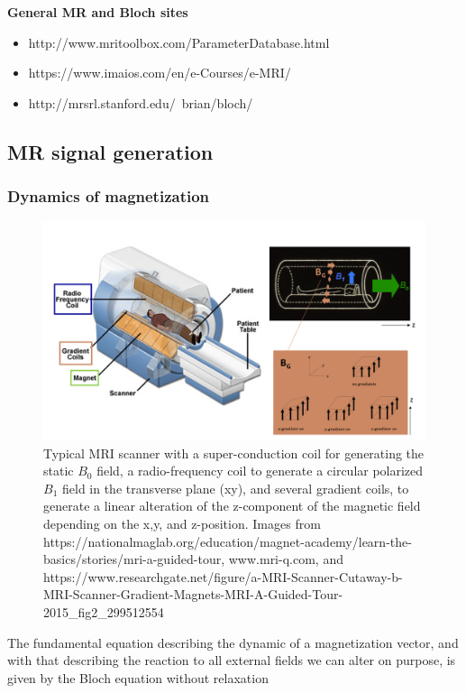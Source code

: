\documentclass[a4paper,12pt]{extarticle}
\begin{document}
\textbf{General MR and Bloch sites}
\begin{itemize}
\item http://www.mritoolbox.com/ParameterDatabase.html
\item https://www.imaios.com/en/e-Courses/e-MRI/
\item http://mrsrl.stanford.edu/~brian/bloch/
\end{itemize}


 \subsection{MR signal generation}
 \subsubsection{Dynamics of magnetization}
 
 \begin{figure}[!ht] 
\centering
\includegraphics[width=16cm]{img/Fig_MRhardware_and_Bfields.png}
\caption{Typical MRI scanner with a super-conduction coil for generating the static $B_0$ field, a radio-frequency coil to generate a  circular polarized $B_1$ field in the transverse plane (xy), and several gradient coils, to generate a linear alteration of the z-component of the magnetic field depending on the x,y, and z-position. Images from https://nationalmaglab.org/education/magnet-academy/learn-the-basics/stories/mri-a-guided-tour, www.mri-q.com, and 
https://www.researchgate.net/figure/a-MRI-Scanner-Cutaway-b-MRI-Scanner-Gradient-Magnets-MRI-A-Guided-Tour-2015\_fig2\_299512554
}\label{fig:MRhardware}
\end{figure}
 The fundamental equation describing the dynamic of a magnetization vector, and with that describing the reaction to all external fields we can alter on purpose, is given by the Bloch equation without relaxation
 
\end{document}
